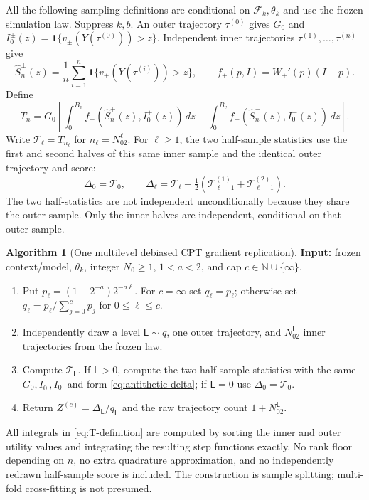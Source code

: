 \documentclass[11pt]{article}
\newcommand{\N}{\mathbb N}
\newcommand{\1}{\mathbf 1}
\newcommand{\cF}{\mathcal F}
\theoremstyle{definition}
\newtheorem{algorithm}{Algorithm}
\begin{document}
All the following sampling definitions are conditional on $\cF_k,\theta_k$ and use the frozen simulation law. Suppress $k,b$. An outer trajectory $\tau^{(0)}$ gives $G_0$ and $I_0^\pm(z)=\1\{v_\pm(Y(\tau^{(0)}))>z\}$. Independent inner trajectories $\tau^{(1)},\ldots,\tau^{(n)}$ give
\begin{equation}\label{eq:empirical-survival}
 \widehat S_n^\pm(z)=\frac1n\sum_{i=1}^n
 \1\{v_\pm(Y(\tau^{(i)}))>z\},\qquad
 f_\pm(p,I)=W_\pm'(p)(I-p).
\end{equation}
Define
\begin{equation}\label{eq:T-definition}
 T_n=G_0\left[\int_0^{B_v}f_+(\widehat S_n^+(z),I_0^+(z))\,dz
 -\int_0^{B_v}f_-(\widehat S_n^-(z),I_0^-(z))\,dz\right].
\end{equation}
Write $\mathcal T_\ell=T_{n_\ell}$ for $n_\ell=N_02^\ell$. For $\ell\ge1$, the two half-sample statistics use the first and second halves of this same inner sample and the identical outer trajectory and score:
\begin{equation}\label{eq:antithetic-delta}
 \Delta_0=\mathcal T_0,\qquad
 \Delta_\ell=\mathcal T_\ell-\tfrac12(\mathcal T_{\ell-1}^{(1)}+\mathcal T_{\ell-1}^{(2)}).
\end{equation}
The two half-statistics are not independent unconditionally because they share the outer sample. Only the inner halves are independent, conditional on that outer sample.

\begin{algorithm}[One multilevel debiased CPT gradient replication]\label{alg:debiased}
\normalfont
\textbf{Input:} frozen context/model, $\theta_k$, integer $N_0\ge1$, $1<a<2$, and cap $c\in\N\cup\{\infty\}$.
\begin{enumerate}
\item Put $p_\ell=(1-2^{-a})2^{-a\ell}$. For $c=\infty$ set $q_\ell=p_\ell$; otherwise set $q_\ell=p_\ell/\sum_{j=0}^cp_j$ for $0\le\ell\le c$.
\item Independently draw a level $\mathsf L\sim q$, one outer trajectory, and $N_02^{\mathsf L}$ inner trajectories from the frozen law.
\item Compute $\mathcal T_{\mathsf L}$. If $\mathsf L>0$, compute the two half-sample statistics with the same $G_0,I_0^+,I_0^-$ and form \eqref{eq:antithetic-delta}; if $\mathsf L=0$ use $\Delta_0=\mathcal T_0$.
\item Return $Z^{(c)}=\Delta_{\mathsf L}/q_{\mathsf L}$ and the raw trajectory count $1+N_02^{\mathsf L}$.
\end{enumerate}
\end{algorithm}
All integrals in \eqref{eq:T-definition} are computed by sorting the inner and outer utility values and integrating the resulting step functions exactly. No rank floor depending on $n$, no extra quadrature approximation, and no independently redrawn half-sample score is included. The construction is sample splitting; multi-fold cross-fitting is not presumed.
\end{document}
